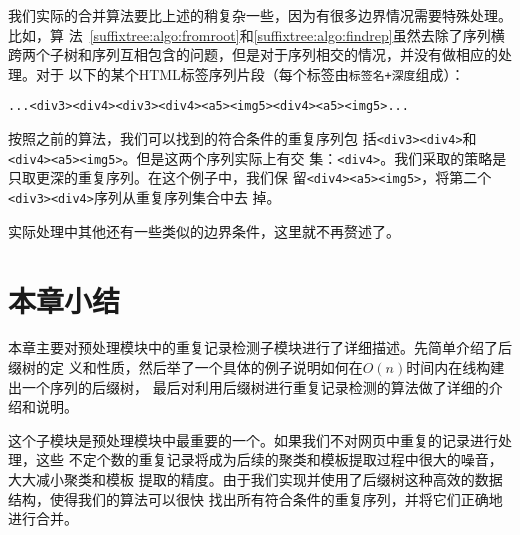 我们实际的合并算法要比上述的稍复杂一些，因为有很多边界情况需要特殊处理。比如，算
法~\ref{suffixtree:algo:fromroot}和\ref{suffixtree:algo:findrep}虽然去除了序列横
跨两个子树和序列互相包含的问题，但是对于序列相交的情况，并没有做相应的处理。对于
以下的某个HTML标签序列片段（每个标签由\texttt{标签名+深度}组成）：
\begin{verbatim}
...<div3><div4><div3><div4><a5><img5><div4><a5><img5>...
\end{verbatim}
按照之前的算法，我们可以找到的符合条件的重复序列包
括\texttt{<div3><div4>}和\texttt{<div4><a5><img5>}。但是这两个序列实际上有交
集：\texttt{<div4>}。我们采取的策略是只取更深的重复序列。在这个例子中，我们保
留\texttt{<div4><a5><img5>}，将第二个\texttt{<div3><div4>}序列从重复序列集合中去
掉。

实际处理中其他还有一些类似的边界条件，这里就不再赘述了。

\section{本章小结}
\label{sec:summarysuffixtree}
本章主要对预处理模块中的重复记录检测子模块进行了详细描述。先简单介绍了后缀树的定
义和性质，然后举了一个具体的例子说明如何在$O(n)$时间内在线构建出一个序列的后缀树，
最后对利用后缀树进行重复记录检测的算法做了详细的介绍和说明。

这个子模块是预处理模块中最重要的一个。如果我们不对网页中重复的记录进行处理，这些
不定个数的重复记录将成为后续的聚类和模板提取过程中很大的噪音，大大减小聚类和模板
提取的精度。由于我们实现并使用了后缀树这种高效的数据结构，使得我们的算法可以很快
找出所有符合条件的重复序列，并将它们正确地进行合并。

